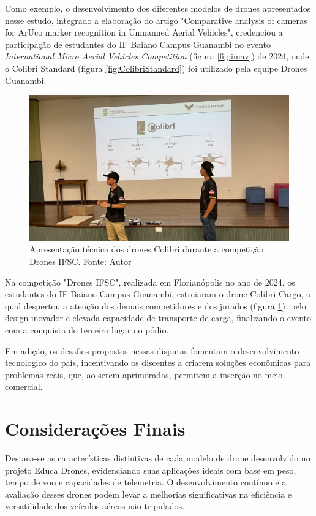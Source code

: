 \documentclass[conference]{IEEEtran}
\begin{document}
Como exemplo, o desenvolvimento dos diferentes modelos de drones apresentados nesse estudo, integrado a elaboração do artigo "Comparative analysis of cameras for ArUco marker recognition in Unmanned Aerial Vehicles"\cite{a1}, credenciou a participação de estudantes do IF Baiano Campus Guanambi no evento \textit{International Micro Aerial Vehicles Competition} (figura \ref{fig:imav}) de 2024, onde o Colibri Standard (figura \ref{fig:ColibriStandard}) foi utilizado pela equipe Drones Guanambi.

\begin{figure}[!htb]
    \centering
    \includegraphics[scale=0.30]{img/ifsc.png} 
    \caption{Apresentação técnica dos drones Colibri durante a competição Drones IFSC. Fonte: Autor}
    \label{fig:ifsc}
\end{figure}

Na competição "Drones IFSC", realizada em Florianópolis no ano de 2024, os estudantes do IF Baiano Campus Guanambi, estreiaram o drone Colibri Cargo, o qual despertou a atenção dos demais competidores e dos jurados (figura \ref{fig:ifsc}), pelo design inovador e elevada capacidade de transporte de carga, finalizando o evento com a conquista do terceiro lugar no pódio.

Em adição, os desafios propostos nessas disputas fomentam o desenvolvimento tecnologico do país, incentivando os discentes a criarem soluções econômicas para problemas reais, que, ao serem aprimoradas, permitem a inserção no meio comercial.

\section*{Considerações Finais}

Destaca-se as características distintivas de cada modelo de drone desenvolvido no projeto Educa Drones, evidenciando suas aplicações ideais com base em peso, tempo de voo e capacidades de telemetria. O desenvolvimento contínuo e a avaliação desses drones podem levar a melhorias significativas na eficiência e versatilidade dos veículos aéreos não tripulados.
\end{document}

